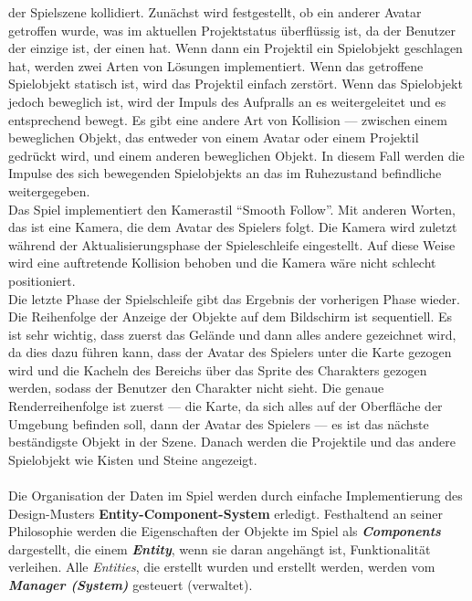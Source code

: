 \documentclass[
  10pt,
  a4paper,
  oneside,
  headers,
  headinclude,
  footinclude,
  BCOR5mm,
]{article}
\begin{document}
der Spielszene kollidiert. Zunächst wird festgestellt, ob ein anderer Avatar
getroffen wurde, was im aktuellen Projektstatus überflüssig ist, da der Benutzer
der einzige ist, der einen hat. Wenn dann ein Projektil ein Spielobjekt
geschlagen hat, werden zwei Arten von Lösungen implementiert. Wenn das
getroffene Spielobjekt statisch ist, wird das Projektil einfach zerstört. Wenn
das Spielobjekt jedoch beweglich ist, wird der Impuls des Aufpralls an es
weitergeleitet und es entsprechend bewegt. Es gibt eine andere Art von Kollision
--- zwischen einem beweglichen Objekt, das entweder von einem Avatar oder einem
Projektil gedrückt wird, und einem anderen beweglichen Objekt. In diesem Fall
werden die Impulse des sich bewegenden Spielobjekts an das im Ruhezustand
befindliche weitergegeben. \\
Das Spiel implementiert den Kamerastil ``Smooth Follow''. Mit anderen Worten,
das ist eine Kamera, die dem Avatar des Spielers folgt. Die Kamera wird zuletzt
während der Aktualisierungsphase der Spieleschleife eingestellt. Auf diese Weise
wird eine auftretende Kollision behoben und die Kamera wäre nicht schlecht
positioniert. \\
Die letzte Phase der Spielschleife gibt das Ergebnis der vorherigen Phase
wieder. Die Reihenfolge der Anzeige der Objekte auf dem Bildschirm ist
sequentiell. Es ist sehr wichtig, dass zuerst das Gelände und dann alles andere
gezeichnet wird, da dies dazu führen kann, dass der Avatar des Spielers unter
die Karte gezogen wird und die Kacheln des Bereichs über das Sprite des
Charakters gezogen werden, sodass der Benutzer den Charakter nicht sieht. Die
genaue Renderreihenfolge ist zuerst --- die Karte, da sich alles auf der
Oberfläche der Umgebung befinden soll, dann der Avatar des Spielers --- es ist
das nächste beständigste Objekt in der Szene. Danach werden die Projektile und
das andere Spielobjekt wie Kisten und Steine angezeigt. \\
\paragraph{}
Die Organisation der Daten im Spiel werden durch einfache Implementierung des
Design-Musters \textbf{Entity-Component-System} erledigt. Festhaltend an seiner
Philosophie werden die Eigenschaften der Objekte im Spiel als
\textit{\textbf{Components}} dargestellt, die einem \textit{\textbf{Entity}},
wenn sie daran angehängt ist, Funktionalität verleihen. Alle \textit{Entities},
die erstellt wurden und erstellt werden, werden vom
\textit{\textbf{Manager (System)}} gesteuert (verwaltet). \\
\end{document}
